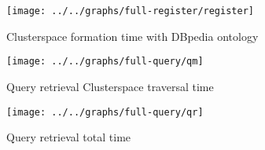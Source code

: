 \documentclass[conference]{IEEEtran}
\begin{document}
\begin{figure*}
    \centering
    \texttt{[image: ../../graphs/full-register/register]}
    \caption{Clusterspace formation time with DBpedia ontology}
    \label{fig:eval:cs-form}
\end{figure*}

\begin{figure*}
    \centering
    \texttt{[image: ../../graphs/full-query/qm]}
    \caption{Query retrieval Clusterspace traversal time}
    \label{fig:eval:qcs}
\end{figure*}

\begin{figure*}
    \centering
    \texttt{[image: ../../graphs/full-query/qr]}
    \caption{Query retrieval total time}
    \label{fig:eval:qtotal}
\end{figure*}





\end{document}
